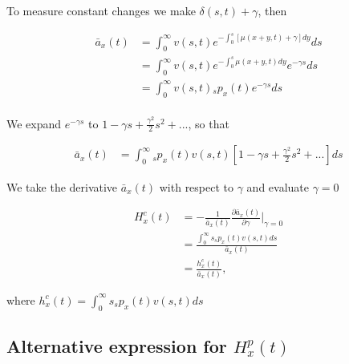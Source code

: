 \documentclass[12pt]{article}
\begin{document}
To measure constant changes we make $\delta(s,t)+\gamma$, then

\begin{equation}\label{eq:EntropyConst1}
\begin{split}
\bar{a}_{x}(t) &= \int_0^\infty{v}(s,t) e^{-\int_{0}^{s} [\mu(x+y,t)+\gamma]dy}ds \\
&= \int_0^\infty {v}(s,t)e^{-\int_{0}^{s} \mu(x+y,t)dy} e^{-\gamma s}ds \\
&= \int_0^\infty {v}(s,t){}_sp_x(t) e^{-\gamma s}ds \\
\end{split}
\end{equation}

We expand $e^{-\gamma s}$ to $1-\gamma s+\frac{\gamma^2}{2} s^{2} +...$, so that


\begin{equation}\label{eq:EntropyConst2}
\begin{split}
\bar{a}_{x}(t) &= \int_0^\infty {}_sp_x(t) {v}(s,t)[1-\gamma s+\frac{\gamma^2}{2} s^{2} +...]ds
\end{split}
\end{equation}

We take the derivative $\bar{a}_{x}(t)$ with respect to $\gamma$ and evaluate $\gamma=0$


\begin{equation}\label{eq:EntropyConst3}
\begin{split}
{H}^{c}_x(t)&=-\frac{1}{\bar{a}_x(t)}\frac{\partial \bar{a}_x(t)}{\partial \gamma} \bigg\rvert_{\gamma=0}\\
&= \frac{\int_0^\infty s {}_sp_x(t) {v}(s,t)ds}{\bar{a}_x(t)} \\
&= \frac{{h}^{c}_x(t)}{\bar{a}_x(t)},
\end{split}
\end{equation}

where ${h}^{c}_x(t)=\int_0^\infty s {}_sp_x(t) {v}(s,t)ds$



\subsection{Alternative expression for ${H}^{p}_{x}(t)$}
\end{document}
